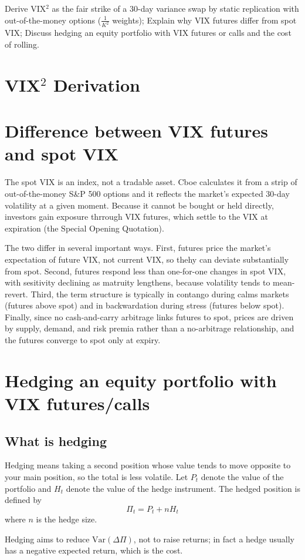 \documentclass[12pt]{article}
\begin{document}
Derive VIX$^2$ as the fair strike of a 30-day variance swap by static replication with out-of-the-money options ($\frac{1}{K^2}$ weights); Explain why VIX futures differ from spot VIX; Discuss hedging an equity portfolio with VIX futures or calls and the cost of rolling.
\section{VIX$^2$ Derivation}
\section{Difference between VIX futures and spot VIX}
The spot VIX is an index, not a tradable asset. Cboe calculates it from a strip of out-of-the-money S\&P 500 options and it reflects the market's expected 30-day volatility at a given moment. Because it cannot be bought or held directly, investors gain exposure thrrough VIX futures, which settle to the VIX at expiration (the Special Opening Quotation).

The two differ in several important ways. First, futures price the market's expectation of future VIX, not current VIX, so thehy can deviate substantially from spot. Second, futures respond less than one-for-one changes in spot VIX, with sesitivity declining as matruity lengthens, because volatility tends to mean-revert. Third, the term structure is typically in contango during calms markets (futures above spot) and in backwardation during stress (futures below spot). Finally, since no cash-and-carry arbitrage links futures to spot, prices are driven by supply, demand, and risk premia rather than a no-arbitrage relationship, and the futures converge to spot only at expiry.

\section{Hedging an equity portfolio with VIX futures/calls}
\subsection{What is hedging}
Hedging means taking a second position whose value tends to move opposite to your main position, so the total is less volatile. Let $P_t$ denote the value of the portfolio and $H_t$ denote the value of the hedge instrument. The hedged position is defined by
\[
    \Pi_t = P_t + n H_t
\]
where $n$ is the hedge size.

Hedging aims to reduce $\mathrm{Var}(\Delta \Pi)$, not to raise returns; in fact a hedge usually has a negative expected return, which is the cost.
\end{document}
